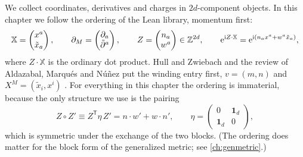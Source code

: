 We collect coordinates, derivatives and charges in $2d$-component objects. In this chapter we
follow the ordering of the Lean library, momentum first:
\begin{equation}\label{eq:doubled:XZ}
\mathbb X=\begin{pmatrix}x^a\\ \tilde x_a\end{pmatrix},\qquad
\partial_M=\begin{pmatrix}\partial_a\\ \tilde\partial^a\end{pmatrix},\qquad
Z=\begin{pmatrix}n_a\\ w^a\end{pmatrix}\in\mathbb{Z}^{2d},\qquad
\mathrm{e}^{\mathrm{i} Z\cdot\mathbb X}=\mathrm{e}^{\mathrm{i}(n_ax^a+w^a\tilde x_a)},
\end{equation}
where $Z\cdot\mathbb X$ is the ordinary dot product. Hull and Zwiebach and the review of
Aldazabal, Marqu\'es and N\'u\~nez put the winding entry first, $v=(m,n)$ and
$X^M=(\tilde x_i,x^i)$ . For everything in this
chapter the ordering is immaterial, because the only structure we use is the pairing
\begin{equation}\label{eq:doubled:eta}
Z\circ Z'\equiv Z^{\mathsf T}\eta\,Z'=n\cdot w'+w\cdot n',\qquad
\eta=\begin{pmatrix}0&\mathbf 1_d\\ \mathbf 1_d&0\end{pmatrix},
\end{equation}
%
which is symmetric under the exchange of the two blocks. (The ordering does matter for the
block form of the generalized metric; see \cref{ch:genmetric}.)

